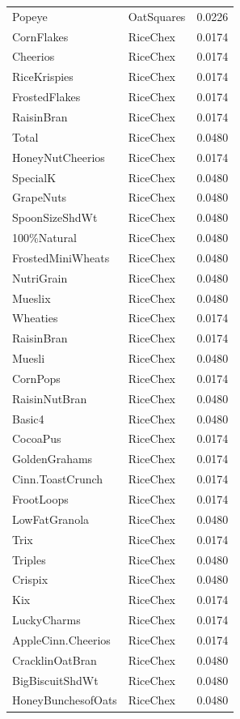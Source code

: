 \begin{table}[!htbp]
\begin{tabular}{lll}
\\
Popeye & OatSquares & 0.0226
\\
CornFlakes & RiceChex & 0.0174
\\
Cheerios & RiceChex & 0.0174
\\
RiceKrispies & RiceChex & 0.0174
\\
FrostedFlakes & RiceChex & 0.0174
\\
RaisinBran & RiceChex & 0.0174
\\
Total & RiceChex & 0.0480
\\
HoneyNutCheerios & RiceChex & 0.0174
\\
SpecialK & RiceChex & 0.0480
\\
GrapeNuts & RiceChex & 0.0480
\\
SpoonSizeShdWt & RiceChex & 0.0480
\\
100\%Natural & RiceChex & 0.0480
\\
FrostedMiniWheats & RiceChex & 0.0480
\\
NutriGrain & RiceChex & 0.0480
\\
Mueslix & RiceChex & 0.0480
\\
Wheaties & RiceChex & 0.0174
\\
RaisinBran & RiceChex & 0.0174
\\
Muesli & RiceChex & 0.0480
\\
CornPops & RiceChex & 0.0174
\\
RaisinNutBran & RiceChex & 0.0480
\\
Basic4 & RiceChex & 0.0480
\\
CocoaPus & RiceChex & 0.0174
\\
GoldenGrahams & RiceChex & 0.0174
\\
Cinn.ToastCrunch & RiceChex & 0.0174
\\
FrootLoops & RiceChex & 0.0174
\\
LowFatGranola & RiceChex & 0.0480
\\
Trix & RiceChex & 0.0174
\\
Triples & RiceChex & 0.0480
\\
Crispix & RiceChex & 0.0480
\\
Kix & RiceChex & 0.0174
\\
LuckyCharms & RiceChex & 0.0174
\\
AppleCinn.Cheerios & RiceChex & 0.0174
\\
CracklinOatBran & RiceChex & 0.0480
\\
BigBiscuitShdWt & RiceChex & 0.0480
\\
HoneyBunchesofOats & RiceChex & 0.0480

\end{tabular}
\end{table}
